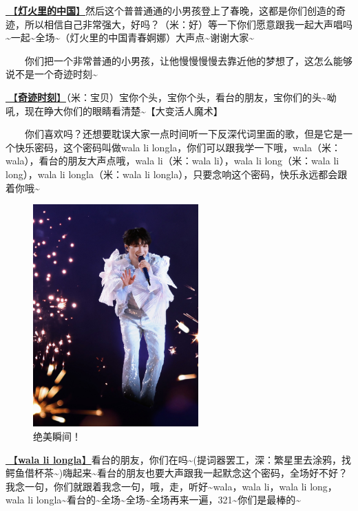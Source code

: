 \documentclass[]{ctexbook}
\begin{document}
\hyperref[China-in-the-light]{🎵【\textbf{灯火里的中国}】}然后这个普普通通的小男孩登上了春晚，这都是你们创造的奇迹，所以相信自己非常强大，好吗？（米：好）等一下你们愿意跟我一起大声唱吗\textasciitilde 一起\textasciitilde 全场\textasciitilde（灯火里的中国青春婀娜）大声点\textasciitilde 谢谢大家\textasciitilde{}

  你们把一个非常普通的小男孩，让他慢慢慢慢去靠近他的梦想了，这怎么能够说不是一个奇迹时刻\textasciitilde{}

\hyperref[magic-moment]{🎵【\textbf{奇迹时刻}】}（米：宝贝）宝你个头，宝你个头，看台的朋友，宝你们的头\textasciitilde 呦吼，现在睁大你们的眼睛看清楚\textasciitilde【大变活人魔术】

  你们喜欢吗？还想要耽误大家一点时间听一下反深代词里面的歌，但是它是一个快乐密码，这个密码叫做wala li longla，你们可以跟我学一下哦，wala（米：wala），看台的朋友大声点哦，wala li（米：wala li），wala li long（米：wala li long），wala li longla（米：wala li longla），只要念响这个密码，快乐永远都会跟着你哦\textasciitilde{}

\begin{figure}

{\centering \includegraphics[width=180pt]{img/beijing20240921/001} 

}

\caption{绝美瞬间！}\label{fig:unnamed-chunk-84}
\end{figure}

\hyperref[wala-li-longla]{🎵【\textbf{wala li longla}】}看台的朋友，你们在吗\textasciitilde(提词器罢工，深：繁星里去涂鸦，找鳄鱼借杯茶\textasciitilde)嗨起来\textasciitilde 看台的朋友也要大声跟我一起默念这个密码，全场好不好？我念一句，你们就跟着我念一句，哦，走，听好\textasciitilde wala，wala li，wala li long，wala li longla\textasciitilde 看台的\textasciitilde 全场\textasciitilde 全场\textasciitilde 全场再来一遍，321\textasciitilde 你们是最棒的\textasciitilde{}
\end{document}
